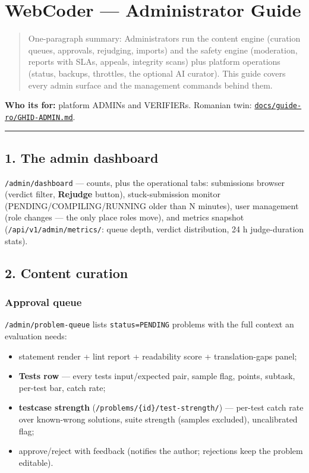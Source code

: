 \documentclass[
]{article}
\author{}
\date{}
\providecommand{\tightlist}{%
  \setlength{\itemsep}{0pt}\setlength{\parskip}{0pt}}
\begin{document}
{
\setcounter{tocdepth}{2}
\tableofcontents
}
\section{WebCoder --- Administrator
Guide}\label{webcoder--administrator-guide}

\begin{quote}
One-paragraph summary: Administrators run the content engine (curation
queues, approvals, rejudging, imports) and the safety engine
(moderation, reports with SLAs, appeals, integrity scans) plus platform
operations (status, backups, throttles, the optional AI curator). This
guide covers every admin surface and the management commands behind
them.
\end{quote}

\textbf{Who it\textquotesingle s for:} platform ADMINs and VERIFIERs.
Romanian twin:
\href{../guide-ro/GHID-ADMIN.md}{\texttt{docs/guide-ro/GHID-ADMIN.md}}.

\begin{center}\rule{0.5\linewidth}{0.5pt}\end{center}

\subsection{1. The admin dashboard}\label{1-the-admin-dashboard}

\texttt{/admin/dashboard} --- counts, plus the operational tabs:
submissions browser (verdict filter, \textbf{Rejudge} button),
stuck-submission monitor (PENDING/COMPILING/RUNNING older than N
minutes), user management (role changes --- the only place roles move),
and metrics snapshot (\texttt{/api/v1/admin/metrics/}: queue depth,
verdict distribution, 24 h judge-duration stats).

\subsection{2. Content curation}\label{2-content-curation}

\subsubsection{Approval queue}\label{approval-queue}

\texttt{/admin/problem-queue} lists \texttt{status=PENDING} problems
with the full context an evaluation needs:

\begin{itemize}
\tightlist
\item
  statement render + lint report + readability score + translation-gaps
  panel;
\item
  \textbf{Tests row} --- every test\textquotesingle s input/expected
  pair, sample flag, points, subtask, per-test bar, catch rate;
\item
  \textbf{testcase strength} (\texttt{/problems/\{id\}/test-strength/})
  --- per-test catch rate over known-wrong solutions, suite strength
  (samples excluded), uncalibrated flag;
\item
  approve/reject with feedback (notifies the author; rejections keep the
  problem editable).
\end{itemize}
\end{document}
